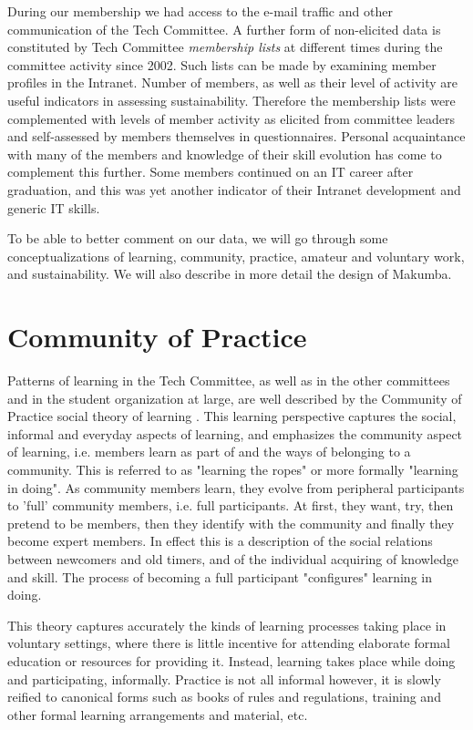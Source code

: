 \documentclass{acm_proc_article-sp}
\begin{document}
During our membership we had access to the e-mail traffic and other communication of the Tech Committee. A further form of non-elicited data is constituted by Tech Committee {\it membership lists} at different times during the committee activity since 2002. Such lists can be made by examining member profiles in the Intranet. Number of members, as well as their level of activity are useful indicators in assessing sustainability. Therefore the membership lists were complemented with levels of member activity as elicited from committee leaders and self-assessed by members themselves in questionnaires. Personal acquaintance with many of the members and knowledge of their skill evolution has come to complement this further. Some members continued on an IT career after graduation, and this was yet another indicator of their Intranet development and generic IT skills. 

To be able to better comment on our data, we will go through some conceptualizations of learning, community, practice, amateur and voluntary work, and sustainability. We will also describe in more detail the design of Makumba.

\section{Community of Practice}\label{sec:cop}
Patterns of learning in the Tech Committee, as well as in the other committees and in the student organization at large, are well described by the Community of Practice social theory of learning  \cite{lave_wenger91, wenger98}. This learning perspective captures the social, informal and everyday aspects of learning, and emphasizes the community aspect of learning, i.e. members learn as part of and the ways of belonging to a community. This is referred to as "learning the ropes" or more formally "learning in doing".  As community members learn, they evolve from peripheral participants to 'full' community members, i.e. full participants. At first, they want, try, then pretend to be members, then they identify with the community and finally they become expert members. 
In effect this is a description of the social relations between newcomers and old timers, and of the individual acquiring of knowledge and skill. The process of becoming a full participant "configures" learning in doing.

This theory captures accurately the kinds of learning processes taking place in voluntary settings, where there is little incentive for attending elaborate formal education or resources for providing it. Instead, learning takes place while doing and participating, informally.
Practice is not all informal however, it is slowly reified \cite{wenger98} to canonical forms such as books of rules and regulations, training and other formal learning arrangements and material, etc. 
\end{document}
